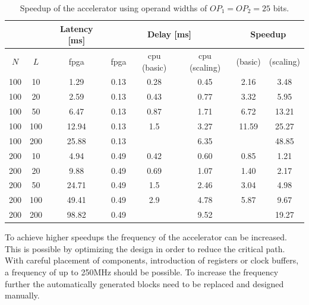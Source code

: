 \documentclass[mscthesis]{usiinfthesis}
\begin{document}
\begin{table}
    \footnotesize
    \begin{center}
    \begin{tabular}{|c|c|c|c|c|c|c|c|}
        \cline{3-8}
        \multicolumn{2}{c|}{} & Latency [ms]
        & \multicolumn{3}{c|}{Delay [ms]}
        & \multicolumn{2}{c|}{Speedup} \\
        \hline
        $N$ & $L$ & \acrshort{fpga} & \acrshort{fpga}
        & \acrshort{cpu} (basic)
        & \acrshort{cpu} (scaling) & (basic) & (scaling) \\
        \hline
        \hline
        100 & 10  & 1.29  & 0.13 & 0.28 & 0.45 & 2.16  & 3.48  \\
        100 & 20  & 2.59  & 0.13 & 0.43 & 0.77 & 3.32  & 5.95  \\
        100 & 50  & 6.47  & 0.13 & 0.87 & 1.71 & 6.72  & 13.21 \\
        \rowcolor{black!20}
        100 & 100 & 12.94 & 0.13 & 1.5  & 3.27 & 11.59 & 25.27 \\
        \rowcolor{black!20}
        100 & 200 & 25.88 & 0.13 &      & 6.35 &       & 48.85 \\
        200 & 10  & 4.94  & 0.49 & 0.42 & 0.60 & 0.85  & 1.21  \\
        200 & 20  & 9.88  & 0.49 & 0.69 & 1.07 & 1.40  & 2.17  \\
        \rowcolor{black!20}
        200 & 50  & 24.71 & 0.49 & 1.5  & 2.46 & 3.04  & 4.98  \\
        \rowcolor{black!20}
        200 & 100 & 49.41 & 0.49 & 2.9  & 4.78 & 5.87  & 9.67  \\
        \rowcolor{black!20}
        200 & 200 & 98.82 & 0.49 &      & 9.52 &       & 19.27 \\
        \hline
    \end{tabular}
    \end{center}
    \caption{Speedup of the accelerator using operand widths of
        $OP_1 = OP_2 = 25$ bits.}
    \label{tab:res_speed}
\end{table}

To achieve higher speedups the frequency of the accelerator can be increased.
This is possible by optimizing the design in order to reduce the critical
path. With careful placement of components, introduction of registers or clock
buffers, a frequency of up to 250MHz should be possible. To increase the
frequency further the automatically generated blocks need to be replaced and
designed manually.
\end{document}
